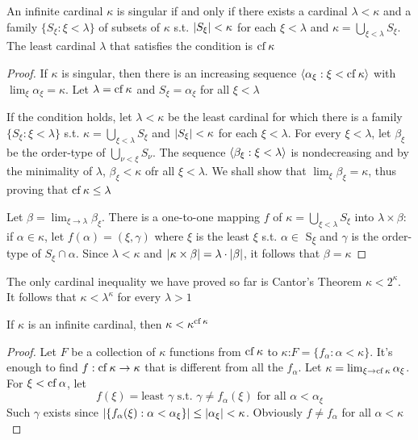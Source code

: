 \documentclass[11pt]{article}
\begin{document}
\begin{lemma}[]
An infinite cardinal \(\kappa\) is singular if and only if there exists a
cardinal \(\lambda<\kappa\) and a family \(\{S_\xi:\xi<\lambda\}\) of subsets of
\(\kappa\) s.t. \(\abs{S_\xi}<\kappa\) for each \(\xi<\lambda\) and
\(\kappa=\bigcup_{\xi<\lambda}S_\xi\). The least cardinal \(\lambda\) that
satisfies the condition is \(\operatorname{cf}\kappa\)
\end{lemma}
\begin{proof}
If \(\kappa\) is singular, then there is an increasing sequence
\(\langle\alpha_\xi:\xi<\operatorname{cf}\kappa\rangle\) with \(\lim_\xi\alpha_\xi=\kappa\). Let
\(\lambda=\operatorname{cf}\kappa\) and \(S_\xi=\alpha_\xi\) for all \(\xi<\lambda\)

If the condition holds, let \(\lambda<\kappa\) be the least cardinal for which
there is a family \(\{S_\xi:\xi<\lambda\}\) s.t.
\(\kappa=\bigcup_{\xi<\lambda}S_\xi\) and \(\abs{S_\xi}<\kappa\) for each
\(\xi<\lambda\). For every \(\xi<\lambda\), let \(\beta_\xi\) be the order-type of
\(\bigcup_{\nu<\xi}S_\nu\). The sequence \(\langle\beta_\xi:\xi<\lambda\rangle\) is
nondecreasing and by the minimality of \(\lambda\), \(\beta_\xi<\kappa\) ofr all
\(\xi<\lambda\). We shall show that \(\lim_\xi\beta_\xi=\kappa\), thus proving
that \(\operatorname{cf}\kappa\le\lambda\)

Let \(\beta=\lim_{\xi\to\lambda}\beta_\xi\). There is a one-to-one mapping \(f\)
of \(\kappa=\bigcup_{\xi<\lambda}S_\xi\) into \(\lambda\times\beta\): if
\(\alpha\in\kappa\), let \(f(\alpha)=(\xi,\gamma)\) where \(\xi\) is the least \(\xi\)
s.t. \(\alpha \in\) S\textsubscript{\(\xi\)} and \(\gamma\) is the order-type of \(S_\xi\cap\alpha\). Since
\(\lambda<\kappa\) and \(\abs{\kappa\times\beta}=\lambda\cdot\abs{\beta}\), it
follows that \(\beta=\kappa\)
\end{proof}

The only cardinal inequality we have proved so far is Cantor's Theorem
\(\kappa<2^\kappa\). It follows that \(\kappa<\lambda^\kappa\) for every
\(\lambda>1\)
\begin{theorem}[]
If \(\kappa\) is an infinite cardinal, then \(\kappa<\kappa^{\operatorname{cf}\kappa}\)
\end{theorem}
\begin{proof}
Let \(F\) be a collection of \(\kappa\) functions from \(\operatorname{cf}\kappa\) to
\(\kappa\):\(F=\{f_\alpha:\alpha<\kappa\}\). It's enough to find
\(f:\operatorname{cf}\kappa\to\kappa\) that is different from all the \(f_\alpha\). Let
\(\kappa=\lim_{\xi\to\operatorname{cf}\kappa}\alpha_\xi\). For \(\xi<\operatorname{cf}\alpha\), let
\begin{equation*}
f(\xi)=\text{least }\gamma\text{ s.t. }\gamma\neq f_\alpha(\xi)
\text{ for all }\alpha<\alpha_\xi 
\end{equation*}
Such \(\gamma\) exists since
\(\abs{\{f_\alpha(\xi):\alpha<\alpha_\xi\}}\le\abs{\alpha_\xi}<\kappa\).
Obviously \(f\neq f_\alpha\) for all \(\alpha<\kappa\)
\end{proof}
\end{document}

